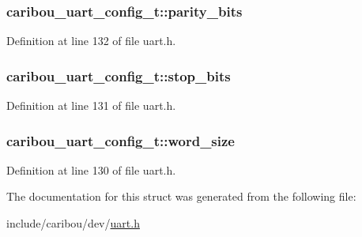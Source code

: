 \hypertarget{structcaribou__uart__config__t_aeb5a0f9cc2e23070859bcb7033777e14}{
\subsubsection[{parity\-\_\-bits}]{ caribou\-\_\-uart\-\_\-config\-\_\-t\-::parity\-\_\-bits}}\label{structcaribou__uart__config__t_aeb5a0f9cc2e23070859bcb7033777e14}


Definition at line 132 of file uart.\-h.

\hypertarget{structcaribou__uart__config__t_a9489f3e6667476da945ac8b99543e9c0}{
\subsubsection[{stop\-\_\-bits}]{ caribou\-\_\-uart\-\_\-config\-\_\-t\-::stop\-\_\-bits}}\label{structcaribou__uart__config__t_a9489f3e6667476da945ac8b99543e9c0}


Definition at line 131 of file uart.\-h.

\hypertarget{structcaribou__uart__config__t_a89d25d0eefe1f3856ccc6568026e00b1}{
\subsubsection[{word\-\_\-size}]{ caribou\-\_\-uart\-\_\-config\-\_\-t\-::word\-\_\-size}}\label{structcaribou__uart__config__t_a89d25d0eefe1f3856ccc6568026e00b1}


Definition at line 130 of file uart.\-h.



The documentation for this struct was generated from the following file\-:\begin{DoxyCompactItemize}
\item 
include/caribou/dev/\hyperlink{uart_8h}{uart.\-h}\end{DoxyCompactItemize}
